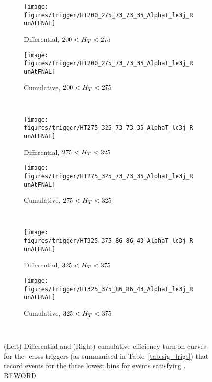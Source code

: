 \begin{figure}[!h]
  \centering
    
    \begin{subfigure}[b]{0.48\textwidth}
      \texttt{[image: figures/trigger/HT200\_275\_73\_73\_36\_AlphaT\_le3j\_RunAtFNAL]}
      \caption{Differential, $200 < H_T < 275 $\gev}
    \end{subfigure}
    \begin{subfigure}[b]{0.48\textwidth}
      \texttt{[image: figures/trigger/HT200\_275\_73\_73\_36\_AlphaT\_le3j\_RunAtFNAL]}
      \caption{Cumulative, $200 < H_T < 275 $\gev}
    \end{subfigure} \\
    \begin{subfigure}[b]{0.48\textwidth}
      \texttt{[image: figures/trigger/HT275\_325\_73\_73\_36\_AlphaT\_le3j\_RunAtFNAL]}
      \caption{Differential, $275 < H_T < 325 $\gev}
    \end{subfigure}
    \begin{subfigure}[b]{0.48\textwidth}
      \texttt{[image: figures/trigger/HT275\_325\_73\_73\_36\_AlphaT\_le3j\_RunAtFNAL]}
      \caption{Cumulative, $275 < H_T < 325 $\gev}
    \end{subfigure} \\
    \begin{subfigure}[b]{0.48\textwidth}
      \texttt{[image: figures/trigger/HT325\_375\_86\_86\_43\_AlphaT\_le3j\_RunAtFNAL]}
      \caption{Differential, $325 < H_T < 375 $\gev}
    \end{subfigure}
    \begin{subfigure}[b]{0.48\textwidth}
      \texttt{[image: figures/trigger/HT325\_375\_86\_86\_43\_AlphaT\_le3j\_RunAtFNAL]}
      \caption{Cumulative, $325 < H_T < 375 $\gev}
    \end{subfigure} \\
  
    \caption{\label{fig:eff_alphat_le3j}
      (Left) Differential and (Right) cumulative efficiency turn-on
      curves for the \HT-\alphat cross triggers (as summarised in
      Table~\ref{tab:sig_trigs}) that record events for the
      three lowest \HT bins  for events satisfying \njlow. REWORD
    }
\end{figure}

